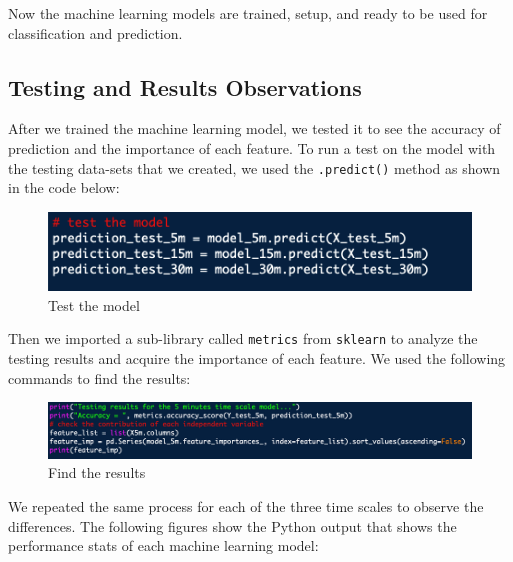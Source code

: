 \documentclass{article}
\begin{document}
Now the machine learning models are trained, setup, and ready to be used for classification and prediction. \newline

\subsection{Testing and Results Observations}
After we trained the machine learning model, we tested it to see the accuracy of prediction and the importance of each feature. To run a test on the model with the testing data-sets that we created, we used the \texttt{.predict()} method as shown in the code below:\newline 

\begin{figure}[!ht]
    \centering
    \includegraphics[width=13cm]{ML2graphs/testmodel.png}
    \caption{Test the model} 
\end{figure}

Then we imported a sub-library called \texttt{metrics} from \texttt{sklearn} to analyze the testing results and acquire the importance of each feature. We used the following commands to find the results:\newline

\begin{figure}[!ht]
    \centering
    \includegraphics[width=15cm]{ML2graphs/findresults.png}
    \caption{Find the results} 
\end{figure}

We repeated the same process for each of the three time scales to observe the differences. The following figures show the Python output that shows the performance stats of each machine learning model:\newline 
\end{document}
